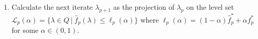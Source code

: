 \documentclass[a0paper,portrait,fontscale=0.35]{baposter}
\newcommand{\mycaption}[1]{
  {
    \smaller
    \emph{#1}
  }
}
\theoremstyle{plain}
\theoremstyle{plain}
\theoremstyle{definition}
\theoremstyle{plain}
\theoremstyle{definition}
\begin{document}
\begin{poster}
{\begin{minipage}[t]{\textwidth}
\begin{enumerate}
        \item Calculate the next iterate $\lambda_{p+1}$ as the projection
          of $\lambda_p$ on the level set 
          $
            \mathcal{L}_p(\alpha) = \{\lambda \in Q ~|~ 
              \hat{f}_p(\lambda) \leq \ell_p(\alpha)\}
          $
          where 
          $
            \ell_p(\alpha) = (1-\alpha)\hat{f}_p^* + \alpha f_p^*
          $
          for some $\alpha \in (0,1)$.
      \end{enumerate}
  \end{minipage}
%     
%
%   
%
%
%     
}
\end{poster}
\end{document}
